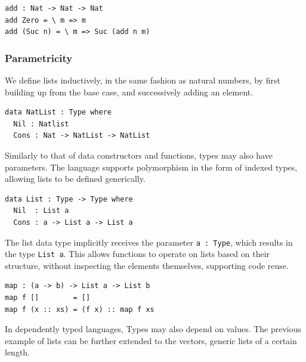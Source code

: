 \documentclass[a4paper]{article}
\begin{document}
\begin{center}
\begin{verbatim}
add : Nat -> Nat -> Nat
add Zero = \ m => m
add (Suc n) = \ m => Suc (add n m)
\end{verbatim}
\end{center}



\subsubsection{Parametricity}
\label{sec:org62c4f95}

We define lists inductively, in the same fashion as natural numbers, by
first building up from the base case, and successively adding an element.

\begin{center}
\begin{verbatim}
data NatList : Type where
  Nil : Natlist
  Cons : Nat -> NatList -> NatList 
\end{verbatim}
\end{center}

Similarly to that of data constructors and functions, types may 
also have parameters. The language supports polymorphism in the form of
indexed types, allowing lists to be defined generically. 

\begin{center}
\begin{verbatim}
data List : Type -> Type where
  Nil  : List a
  Cons : a -> List a -> List a
\end{verbatim}
\end{center}

The list data type implicitly receives the parameter \texttt{a : Type}, which 
results in the type \texttt{List a}. This allows functions to operate on lists
based on their structure, without inspecting the elements themselves,
supporting code reuse. 

\begin{center}
\begin{verbatim}
map : (a -> b) -> List a -> List b
map f []        = []
map f (x :: xs) = (f x) :: map f xs
\end{verbatim}
\end{center}

In dependently typed languages, Types may also depend on values.
The previous example of lists can be further extended to the vectors,
generic lists of a certain length. 
\end{document}
